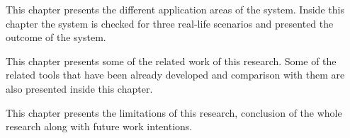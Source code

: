 \noindent  This chapter presents the different application areas of the system. Inside this chapter the system is checked for three real-life scenarios and presented the outcome of the system. 

  \vspace{1mm}

\noindent  This chapter presents some of the related work of this research. Some of the related tools that have been already developed and comparison with them are also presented inside this chapter.



  \vspace{1mm}

\noindent  This chapter presents the limitations of this research, conclusion of the whole research along with future work intentions.